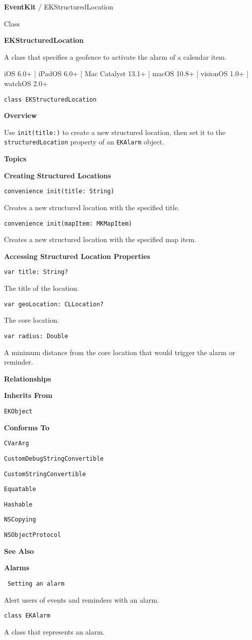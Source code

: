 \documentclass{article}
\title{}
\author{}
\date{}
\begin{document}
\noindent
\textbf{EventKit} / EKStructuredLocation

\noindent
Class

\noindent
\textbf{EKStructuredLocation}

\noindent
A class that specifies a geofence to activate the alarm of a calendar item.

\noindent
iOS 6.0+ | iPadOS 6.0+ | Mac Catalyst 13.1+ | macOS 10.8+ | visionOS 1.0+ | watchOS 2.0+

\noindent
\texttt{class EKStructuredLocation}

\noindent
\textbf{Overview}

\noindent
Use \texttt{init(title:)} to create a new structured location, then set it to the \texttt{structuredLocation} property of an \texttt{EKAlarm} object.

\noindent
\textbf{Topics}

\noindent
\textbf{Creating Structured Locations}

\noindent
\texttt{convenience init(title: String)}

\noindent
Creates a new structured location with the specified title.

\noindent
\texttt{convenience init(mapItem: MKMapItem)}

\noindent
Creates a new structured location with the specified map item.

\noindent
\textbf{Accessing Structured Location Properties}

\noindent
\texttt{var title: String?}

\noindent
The title of the location.

\noindent
\texttt{var geoLocation: CLLocation?}

\noindent
The core location.

\noindent
\texttt{var radius: Double}

\noindent
A minimum distance from the core location that would trigger the alarm or reminder.

\noindent
\textbf{Relationships}

\noindent
\textbf{Inherits From}

\noindent
\texttt{EKObject}

\noindent
\textbf{Conforms To}

\noindent
\texttt{CVarArg}

\noindent
\texttt{CustomDebugStringConvertible}

\noindent
\texttt{CustomStringConvertible}

\noindent
\texttt{Equatable}

\noindent
\texttt{Hashable}

\noindent
\texttt{NSCopying}

\noindent
\texttt{NSObjectProtocol}

\noindent
\textbf{See Also}

\noindent
\textbf{Alarms}

\noindent
\texttt{ Setting an alarm}

\noindent
Alert users of events and reminders with an alarm.

\noindent
\texttt{class EKAlarm}

\noindent
A class that represents an alarm.

\newpage
\end{document}
